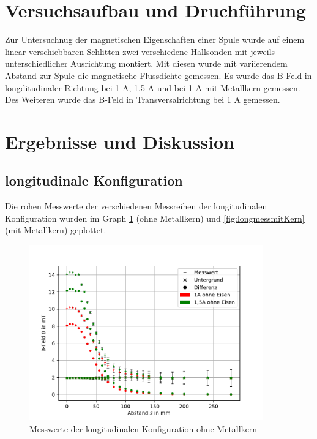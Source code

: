 \documentclass[11pt, a4paper]{article}
\begin{document}
    \section{Versuchsaufbau und Druchführung}
    Zur Untersuchnug der magnetischen Eigenschaften einer Spule wurde auf einem linear verschiebbaren Schlitten zwei verschiedene Hallsonden mit jeweils unterschiedlicher Ausrichtung montiert.
    Mit diesen wurde mit variierendem Abstand zur Spule die magnetische Flussdichte gemessen. Es wurde das B-Feld in longditudinaler Richtung bei 1 \si{\ampere}, 1.5 \si{\ampere} und bei 1 \si{\ampere} mit Metallkern gemessen.
    Des Weiteren wurde das B-Feld in Transversalrichtung bei 1 \si{\ampere} gemessen.
    \section{Ergebnisse und Diskussion}
    \subsection{longitudinale Konfiguration}
    Die rohen Messwerte der verschiedenen Messreihen der longitudinalen Konfiguration wurden im Graph \ref{fig:longmessohneKern} (ohne Metallkern) und \ref{fig:longmessmitKern} (mit Metallkern) geplottet.
    \begin{figure}[h]
        \centering
        \includegraphics[width=0.9\textwidth]{ohneKernRaw.pdf}
        \caption{Messwerte der longitudinalen Konfiguration ohne Metallkern}
        \label{fig:longmessohneKern}
    \end{figure}
\end{document}
